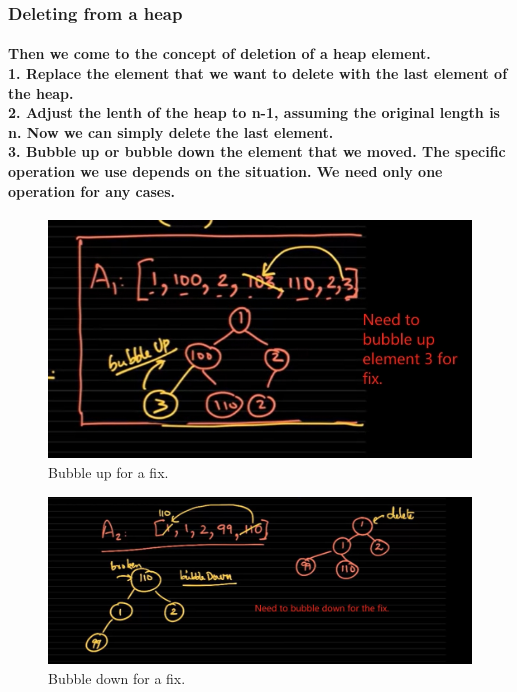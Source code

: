 \documentclass{article}
\begin{document}
\subsubsection{Deleting from a heap}

\paragraph{Then we come to the concept of deletion of a heap element.\\
1. Replace the element that we want to delete with the last element of the heap.\\
2. Adjust the lenth of the heap to n-1, assuming the original length is n. Now we can simply delete the last element.\\
3. Bubble up or bubble down the element that we moved. The specific operation we use depends on the situation. We need only one operation for any cases.\\}

\begin{figure}[h]
\includegraphics[width=\textwidth]{bubbleupafterdeletion.png}
\caption{Bubble up for a fix.}
\end{figure}

\begin{figure}[h]
\includegraphics[width=\textwidth]{bubbledownafterdeletion.png}
\caption{Bubble down for a fix.}
\end{figure}
\end{document}
